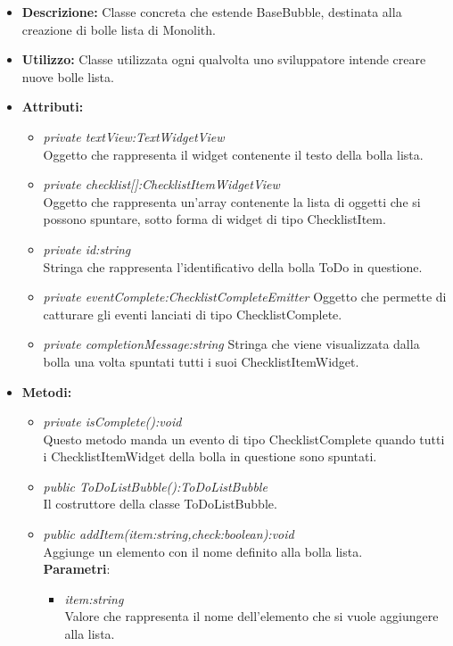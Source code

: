 \begin{itemize}
\item \textbf{Descrizione:} Classe concreta che estende BaseBubble, destinata alla creazione di bolle lista di Monolith.
\item \textbf{Utilizzo:} Classe utilizzata ogni qualvolta uno sviluppatore intende creare nuove bolle lista.
\item \textbf{Attributi:}
\begin{itemize}
\item \textit{private textView:TextWidgetView}\\
Oggetto che rappresenta il widget contenente il testo della bolla lista.
\item \textit{private checklist[]:ChecklistItemWidgetView}\\
Oggetto che rappresenta un'array contenente la lista di oggetti che si possono spuntare, sotto forma di widget di tipo ChecklistItem.
\item \textit {private id:string}\\
Stringa che rappresenta l'identificativo della bolla ToDo in questione.
\item \textit {private eventComplete:ChecklistCompleteEmitter}
Oggetto che permette di catturare gli eventi lanciati di tipo ChecklistComplete.
\item \textit {private completionMessage:string}
Stringa che viene visualizzata dalla bolla una volta spuntati tutti i suoi ChecklistItemWidget.
\end{itemize}
\item \textbf{Metodi:}
\begin{itemize}
\item \textit{private isComplete():void}\\
Questo metodo manda un evento di tipo ChecklistComplete quando tutti i ChecklistItemWidget della bolla in questione sono spuntati.
\item \textit{public ToDoListBubble():ToDoListBubble}\\
Il costruttore della classe ToDoListBubble.
\item \textit{public addItem(item:string,check:boolean):void}\\
Aggiunge un elemento con il nome definito alla bolla lista.
\\ \textbf{Parametri}: \begin{itemize}
\item \textit{item:string}\\
Valore che rappresenta il nome dell'elemento che si vuole aggiungere alla lista.

\end{itemize}
\end{itemize}
\end{itemize}
